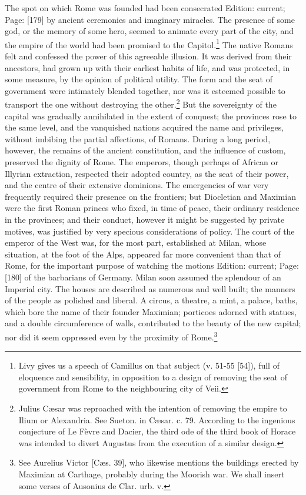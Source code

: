 The spot on which Rome was founded had been consecrated Edition: current; Page: [179] by ancient ceremonies and imaginary miracles. The presence of some god, or the memory of some hero, seemed to animate every part of the city, and the empire of the world had been promised to the Capitol.\footnote{Livy gives us a speech of Camillus on that subject (v. 51-55 [54]), full of eloquence and sensibility, in opposition to a design of removing the seat of government from Rome to the neighbouring city of Veii.} The native Romans felt and confessed the power of this agreeable illusion. It was derived from their ancestors, had grown up with their earliest habits of life, and was protected, in some measure, by the opinion of political utility. The form and the seat of government were intimately blended together, nor was it esteemed possible to transport the one without destroying the other.\footnote{Julius Cæsar was reproached with the intention of removing the empire to Ilium or Alexandria. See Sueton. in Cæsar. c. 79. According to the ingenious conjecture of Le Fèvre and Dacier, the third ode of the third book of Horace was intended to divert Augustus from the execution of a similar design.} But the sovereignty of the capital was gradually annihilated in the extent of conquest; the provinces rose to the same level, and the vanquished nations acquired the name and privileges, without imbibing the partial affections, of Romans. During a long period, however, the remains of the ancient constitution, and the influence of custom, preserved the dignity of Rome. The emperors, though perhaps of African or Illyrian extraction, respected their adopted country, as the seat of their power, and the centre of their extensive dominions. The emergencies of war very frequently required their presence on the frontiers; but Diocletian and Maximian were the first Roman princes who fixed, in time of peace, their ordinary residence in the provinces; and their conduct, however it might be suggested by private motives, was justified by very specious considerations of policy. The court of the emperor of the West was, for the most part, established at Milan, whose situation, at the foot of the Alps, appeared far more convenient than that of Rome, for the important purpose of watching the motions Edition: current; Page: [180] of the barbarians of Germany. Milan soon assumed the splendour of an Imperial city. The houses are described as numerous and well built; the manners of the people as polished and liberal. A circus, a theatre, a mint, a palace, baths, which bore the name of their founder Maximian; porticoes adorned with statues, and a double circumference of walls, contributed to the beauty of the new capital; nor did it seem oppressed even by the proximity of Rome.\footnote{See Aurelius Victor [Cæs. 39], who likewise mentions the buildings erected by Maximian at Carthage, probably during the Moorish war. We shall insert some verses of Ausonius de Clar. urb. v.

}
